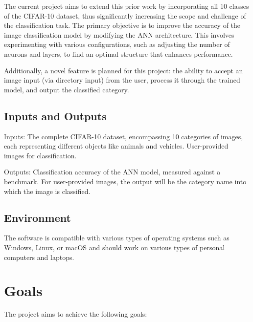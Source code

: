 \documentclass{article}
\begin{document}
The current project aims to extend this prior work by incorporating all 10 classes of the 
CIFAR-10 dataset, thus significantly increasing the scope and challenge of the classification task. 
The primary objective is to improve the accuracy of the image classification model by modifying the 
ANN architecture. This involves experimenting with various configurations, such as adjusting the number 
of neurons and layers, to find an optimal structure that enhances performance.

Additionally, a novel feature is planned for this project: the ability to accept an image input 
(via directory input) from the user, process it through the trained model, and output the classified category. 


\subsection{Inputs and Outputs}

Inputs: The complete CIFAR-10 dataset, encompassing 10 categories of images, each representing different 
objects like animals and vehicles. User-provided images for classification.

Outputs: Classification accuracy of the ANN model, measured against a benchmark. For user-provided images, 
the output will be the category name into which the image is classified.


\subsection{Environment}

The software is compatible with various types of operating systems such as Windows, 
Linux, or macOS and should work on various types of personal computers and laptops.


\section{Goals}

The project aims to achieve the following goals:
\end{document}
